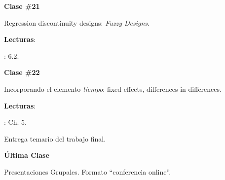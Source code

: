 \documentclass[letterpaper]{article}
\renewenvironment{itemize}{
  \begin{list}{}{
    \setlength{\leftmargin}{1.5em}
  }
}{
  \end{list}
}
\begin{document}
\begin{enumerate}
      \begin{itemize} 
        \item[$\bullet$] {\bf Clase \#21}
          \begin{itemize} 
            \item[$\circ$] Regression discontinuity designs: \emph{Fuzzy Designs}.
            \item[$\circ$] {\bf Lecturas}: 
              \begin{itemize}
                \item[$\diamond$] \textcite{Angrist2009}: 6.2.
              \end{itemize}
          \end{itemize}
      \end{itemize}


      \begin{itemize} 
        \item[$\bullet$] {\bf Clase \#22}
          \begin{itemize} 
            \item[$\circ$] Incorporando el elemento \emph{tiempo}: fixed effects, differences-in-differences.
            \item[$\circ$] {\bf Lecturas}: 
              \begin{itemize}
                \item[$\diamond$] \textcite{Angrist2009}: Ch. 5.
              \end{itemize}
          \end{itemize}
      \end{itemize}

\item[{\color{red}\Pointinghand}] Entrega temario del trabajo final.

      \begin{itemize} 
        \item[$\bullet$] {\bf \'Ultima Clase}
          \begin{itemize} 
            \item[$\circ$] Presentaciones Grupales. Formato ``conferencia online''.
        \end{itemize}
      \end{itemize}


			

\end{enumerate}


\newpage
{}
\setcounter{page}{1}
\printbibliography
\end{document}
